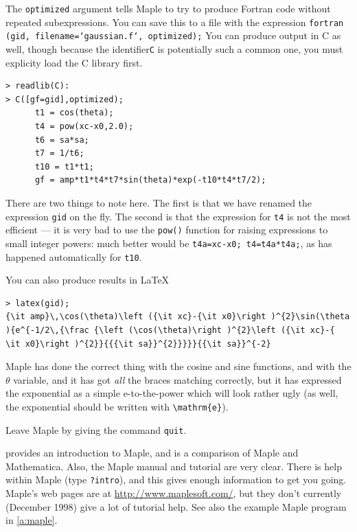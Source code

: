 \documentclass[11pt,oneside,chapters]{starlink}
\begin{document}
The \texttt{optimized} argument tells Maple to try to
produce Fortran code without repeated subexpressions.  You
can save this to a file with the expression
\texttt{fortran (gid, filename=`gaussian.f`, optimized);} You can
produce output in C as well, though because the
identifier\texttt{C} is potentially such a common one,
you must explicity load the C library first.

\begin{verbatim}
> readlib(C):
> C([gf=gid],optimized);
      t1 = cos(theta);
      t4 = pow(xc-x0,2.0);
      t6 = sa*sa;
      t7 = 1/t6;
      t10 = t1*t1;
      gf = amp*t1*t4*t7*sin(theta)*exp(-t10*t4*t7/2);
\end{verbatim}

There are two things to note here.  The first is that we
have renamed the expression \texttt{gid} on the fly.
The second is that the expression for \texttt{t4} is not
the most efficient --- it is very bad to use the
\texttt{pow()} function for raising expressions to small
integer powers: much better would be \texttt{t4a=xc-x0; t4=t4a*t4a;},
as has happened automatically for
\texttt{t10}.

You can also produce results in LaTeX

\begin{verbatim}
> latex(gid);
{\it amp}\,\cos(\theta)\left ({\it xc}-{\it x0}\right )^{2}\sin(\theta
){e^{-1/2\,{\frac {\left (\cos(\theta)\right )^{2}\left ({\it xc}-{
\it x0}\right )^{2}}{{{\it sa}}^{2}}}}}{{\it sa}}^{-2}
\end{verbatim}

Maple has done the correct thing with the cosine and sine
functions, and with the $\theta$
variable, and it has got \emph{all} the braces matching
correctly, but it has expressed the exponential as a simple
e-to-the-power which will look rather ugly (as well, the
exponential should be written with \texttt{\textbackslash{}mathrm\{e\}}).

Leave Maple by giving the command \texttt{quit}.

 provides an
introduction to Maple, and
 is a comparison of Maple and Mathematica.
Also, the Maple manual and tutorial are very clear.  There
is help within Maple (type \texttt{?intro}), and this
gives enough information to get you going.  Maple's web
pages are at \url{http://www.maplesoft.com/}, but they
don't currently (December 1998) give a lot of tutorial help.
See also the example Maple program in \ref{a:maple}.
\end{document}
